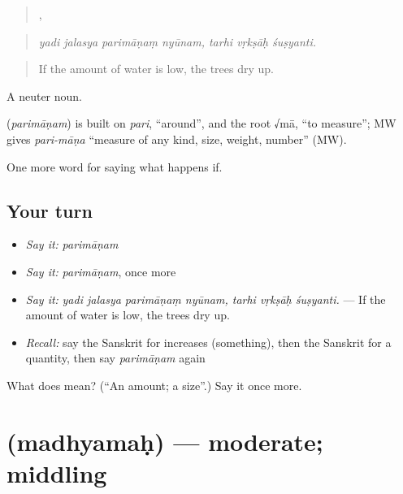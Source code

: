 \begin{quote}
   ,   
\end{quote}

\begin{quote}
\emph{yadi jalasya parimāṇaṃ nyūnam, tarhi vṛkṣāḥ śuṣyanti.}
\end{quote}

\begin{quote}
If the amount of water is low, the trees dry up.
\end{quote}

A neuter noun.

\begin{cousinweb}
\textbf{} (\emph{parimāṇam}) is built on \emph{pari}, \textquotedblleft{}around\textquotedblright{}, and the root √mā, \textquotedblleft{}to measure\textquotedblright{}; MW gives \emph{pari-māṇa} \textquotedblleft{}measure of any kind, size, weight, number\textquotedblright{} (MW).
\end{cousinweb}

\begin{grammarlens}[title={What you've built}]
One more word for saying what happens if.
\end{grammarlens}

\subsection*{Your turn}
\begin{itemize}
\raggedright
  \item \emph{Say it:} \emph{parimāṇam}
  \item \emph{Say it:} \emph{parimāṇam}, once more
  \item \emph{Say it:} \emph{yadi jalasya parimāṇaṃ nyūnam, tarhi vṛkṣāḥ śuṣyanti.} — If the amount of water is low, the trees dry up.
  \item \emph{Recall:} say the Sanskrit for increases (something), then the Sanskrit for a quantity, then say \emph{parimāṇam} again
\end{itemize}

\begin{tcolorbox}[breakable,colback=teal!4,colframe=teal!35!black,title={Before you move on}]
What does  mean? (\textquotedblleft{}An amount; a size\textquotedblright{}.) Say it once more.
\end{tcolorbox}
\section[\texorpdfstring{\sk{मध्यमः} (madhyamaḥ)}{मध्यमः (madhyamaḥ)}]{ (madhyamaḥ) — moderate; middling}

